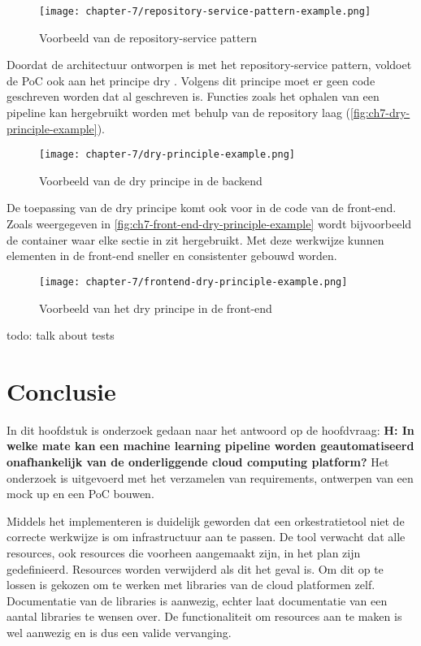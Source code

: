 \begin{figure}[hbt!]
  \centering
  \texttt{[image: chapter-7/repository-service-pattern-example.png]}
  \caption{Voorbeeld van de repository-service pattern}
  \label{fig:ch7-repository-service-pattern-example}
\end{figure}

Doordat de architectuur ontworpen is met het repository-service pattern, voldoet de PoC ook aan het principe \acrfull{dry} \cite{clean-code-martin}. Volgens dit principe moet er geen code geschreven worden dat al geschreven is. Functies zoals het ophalen van een pipeline kan hergebruikt worden met behulp van de repository laag (\autoref{fig:ch7-dry-principle-example}).

\begin{figure}[hbt!]
  \centering
  \texttt{[image: chapter-7/dry-principle-example.png]}
  \caption{Voorbeeld van de \acrfull{dry} principe in de backend}
  \label{fig:ch7-dry-principle-example}
\end{figure}

De toepassing van de \acrshort{dry} principe komt ook voor in de code van de front-end. Zoals weergegeven in \autoref{fig:ch7-front-end-dry-principle-example} wordt bijvoorbeeld de container waar elke sectie in zit hergebruikt. Met deze werkwijze kunnen elementen in de front-end sneller en consistenter gebouwd worden.

\begin{figure}[hbt!]
  \centering
  \texttt{[image: chapter-7/frontend-dry-principle-example.png]}
  \caption{Voorbeeld van het \acrfull{dry} principe in de front-end}
  \label{fig:ch7-front-end-dry-principle-example}
\end{figure}

\newpage

todo: talk about tests


\section{Conclusie}\label{sec:ch7-conclusie}
In dit hoofdstuk is onderzoek gedaan naar het antwoord op de hoofdvraag: \textbf{H: In welke mate kan een machine learning pipeline worden geautomatiseerd onafhankelijk van de onderliggende cloud computing platform?} Het onderzoek is uitgevoerd met het verzamelen van requirements, ontwerpen van een mock up en een PoC bouwen.

Middels het implementeren is duidelijk geworden dat een orkestratietool niet de correcte werkwijze is om infrastructuur aan te passen. De tool verwacht dat alle resources, ook resources die voorheen aangemaakt zijn, in het plan zijn gedefinieerd. Resources worden verwijderd als dit het geval is. Om dit op te lossen is gekozen om te werken met libraries van de cloud platformen zelf. Documentatie van de libraries is aanwezig, echter laat documentatie van een aantal libraries te wensen over. De functionaliteit om resources aan te maken is wel aanwezig en is dus een valide vervanging.

